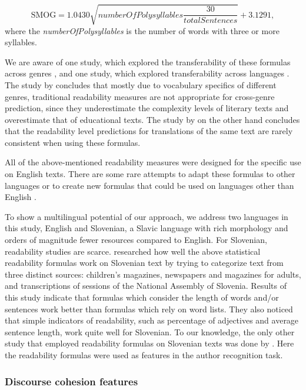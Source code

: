 \documentclass{clv3}
\begin{document}
\[\textrm{SMOG}  = 1.0430 \sqrt{\textit{numberOfPolysyllables} \frac{30} {totalSentences}} + 3.1291, \] where the \textit{numberOfPolysyllables} is the number of words with three or more syllables.

We are aware of one study, which explored the transferability of these formulas across genres \citep{sheehan2013two}, and one study, which explored transferability across languages \citep{madrazo2020cross}. The study by \citet{sheehan2013two} concludes that mostly due to vocabulary specifics of different genres, traditional readability measures are not appropriate for cross-genre prediction, since they underestimate the complexity levels of literary texts and overestimate that of educational texts. The study by \citet{madrazo2020cross} on the other hand concludes that the readability level predictions for translations of the same text are rarely consistent when using these formulas. 

All of the above-mentioned readability measures were designed for the specific use on English texts. There are some rare attempts to adapt these formulas to other languages \citep{kandel1958application} or to create new formulas that could be used on languages other than English \citep{anderson1981analysing}. 

To show a multilingual potential of our approach, we address two languages in this study, English and Slovenian, a Slavic language with rich morphology and orders of magnitude fewer resources compared to English. 
For Slovenian, readability studies are scarce. \citet{vskvorcevaluation} researched how well the above statistical readability formulas work on Slovenian text by trying to categorize text from three distinct sources: children's magazines, newspapers and magazines for adults, and transcriptions of sessions of the National Assembly of Slovenia. Results of this study indicate that formulas which consider the length of words and/or sentences work better than formulas which rely on word lists. They also noticed that simple indicators of readability, such as percentage of adjectives and average sentence length, work quite well for Slovenian. To our knowledge, the only other study that employed readability formulas on Slovenian texts was done by \citet{vitez2014ugotavljanje}. Here the readability formulas were used as features in the author recognition task.

\subsubsection{Discourse cohesion features}
\label{sec:discourse-cohesion}
\end{document}
